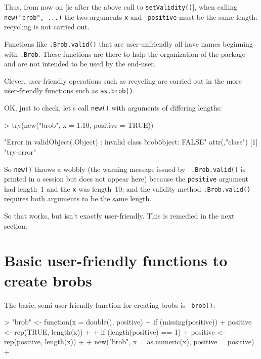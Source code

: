 \documentclass[a4paper]{article}
\begin{document}
Thus, from now on [ie after the above call to {\tt setValidity()}],
when calling {\tt new("brob", ...)} the two arguments {\tt x} and {\tt
positive} must be the same length: recycling is not carried out.


Functions like {\tt .Brob.valid()} that are user-unfriendly all have
names beginning with {\tt .Brob}.  These functions are there to halp
the organization of the package and are not intended to be used by the
end-user.

Clever, user-friendly operations such as recycling are carried out in
the more user-friendly functions such as {\tt as.brob()}.

OK, just to check, let's call {\tt new()} with arguments of differing lengths:

\begin{Schunk}
\begin{Sinput}
> try(new("brob", x = 1:10, positive = TRUE))
\end{Sinput}
\begin{Soutput}
[1] "Error in validObject(.Object) : invalid class \"brob\" object: FALSE\n"
attr(,"class")
[1] "try-error"
\end{Soutput}
\end{Schunk}

So {\tt new()} throws a wobbly (the warning message issued by {\tt
.Brob.valid()} is printed in a session but does not appear here)
because the {\tt positive} argument had length~1 and the {\tt x} was
length~10; and the validity method {\tt .Brob.valid()} requires both
arguments to be the same length.

So that works, but isn't exactly user-friendly.  This is remedied in
the next section.

\section{Basic user-friendly functions to create brobs}

The basic, semi user-friendly function for creating brobs is {\tt
brob()}:

\begin{Schunk}
\begin{Sinput}
> "brob" <- function(x = double(), positive) {
+     if (missing(positive)) {
+         positive <- rep(TRUE, length(x))
+     }
+     if (length(positive) == 1) {
+         positive <- rep(positive, length(x))
+     }
+     new("brob", x = as.numeric(x), positive = positive)
+ }
\end{Sinput}
\end{Schunk}
\end{document}
